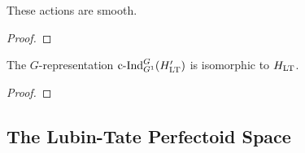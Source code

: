 \documentclass[../main.tex]{subfiles}
\begin{document}
\begin{lem}\label{lem:GActsSmoothlyOnHLT}
  These actions are smooth.
  \begin{proof}
  \end{proof}
\end{lem}

\begin{lem}\label{lem:InductionStatementOnHLT}
  The $G$-representation $\mathrm{c\text{-}Ind}_{G^1}^G (H'_{\mathrm{LT}})$ is isomorphic to $H_{\mathrm{LT}}$. 
\begin{proof}
\end{proof}
\end{lem}


\subsection{The Lubin-Tate Perfectoid Space} %
\label{sub:The Lubin-Tate Perfectoid Space}


\end{document}
